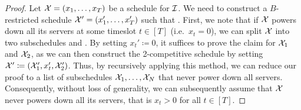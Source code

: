 \begin{proof}
Let $\mathcal{X}=(x_1,\dotsc,x_T)$ be a schedule for $\mathcal{I}$. We need to construct a $B$-restricted schedule $\mathcal{X}'=(x_1',\dotsc,x_T')$ such that .
First, we note that if $\mathcal{X}$ powers down all its servers at some timeslot $t\in[T]$ (i.e.\ $x_t=0$), we can split $\mathcal{X}$ into two subschedules  and . By setting $x_t'\coloneqq0$, it suffices to prove the claim for $\mathcal{X}_1$ and $\mathcal{X}_2$, as we can then construct the 2-competitive schedule by setting $\mathcal{X}'\coloneqq(\mathcal{X}_1',x_t',\mathcal{X}_2')$. Thus, by recursively applying this method, we can reduce our proof to a list of subschedules $\mathcal{X}_1,\dotsc,\mathcal{X}_N$ that never power down all servers. Consequently, without loss of generality, we can subsequently assume that $\mathcal{X}$ never powers down all its servers, that is $x_t>0$ for all $t\in[T]$. 
	

\end{proof}
